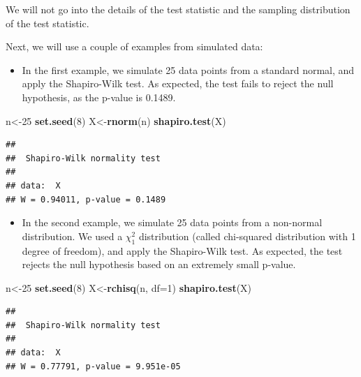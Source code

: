 \documentclass[
]{book}
\newenvironment{Shaded}{\begin{snugshade}}{\end{snugshade}}
\newcommand{\AttributeTok}[1]{\textcolor[rgb]{0.13,0.29,0.53}{#1}}
\newcommand{\DecValTok}[1]{\textcolor[rgb]{0.00,0.00,0.81}{#1}}
\newcommand{\FunctionTok}[1]{\textcolor[rgb]{0.13,0.29,0.53}{\textbf{#1}}}
\newcommand{\NormalTok}[1]{#1}
\newcommand{\OtherTok}[1]{\textcolor[rgb]{0.56,0.35,0.01}{#1}}
\providecommand{\tightlist}{%
  \setlength{\itemsep}{0pt}\setlength{\parskip}{0pt}}
\begin{document}
We will not go into the details of the test statistic and the sampling distribution of the test statistic.

Next, we will use a couple of examples from simulated data:

\begin{itemize}
\tightlist
\item
  In the first example, we simulate 25 data points from a standard normal, and apply the Shapiro-Wilk test. As expected, the test fails to reject the null hypothesis, as the p-value is 0.1489.
\end{itemize}

\begin{Shaded}
\begin{Highlighting}[]
\NormalTok{n}\OtherTok{\textless{}{-}}\DecValTok{25}
\FunctionTok{set.seed}\NormalTok{(}\DecValTok{8}\NormalTok{)}
\NormalTok{X}\OtherTok{\textless{}{-}}\FunctionTok{rnorm}\NormalTok{(n)}
\FunctionTok{shapiro.test}\NormalTok{(X)}
\end{Highlighting}
\end{Shaded}

\begin{verbatim}
## 
##  Shapiro-Wilk normality test
## 
## data:  X
## W = 0.94011, p-value = 0.1489
\end{verbatim}

\begin{itemize}
\tightlist
\item
  In the second example, we simulate 25 data points from a non-normal distribution. We used a \(\chi_1^2\) distribution (called chi-squared distribution with 1 degree of freedom), and apply the Shapiro-Wilk test. As expected, the test rejects the null hypothesis based on an extremely small p-value.
\end{itemize}

\begin{Shaded}
\begin{Highlighting}[]
\NormalTok{n}\OtherTok{\textless{}{-}}\DecValTok{25}
\FunctionTok{set.seed}\NormalTok{(}\DecValTok{8}\NormalTok{)}
\NormalTok{X}\OtherTok{\textless{}{-}}\FunctionTok{rchisq}\NormalTok{(n, }\AttributeTok{df=}\DecValTok{1}\NormalTok{)}
\FunctionTok{shapiro.test}\NormalTok{(X)}
\end{Highlighting}
\end{Shaded}

\begin{verbatim}
## 
##  Shapiro-Wilk normality test
## 
## data:  X
## W = 0.77791, p-value = 9.951e-05
\end{verbatim}
\end{document}
